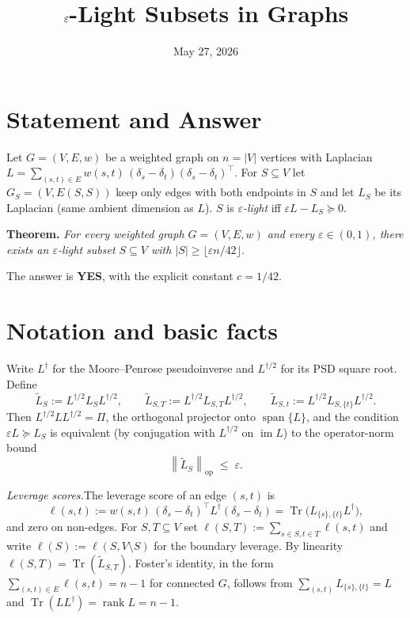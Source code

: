 \documentclass[11pt]{article}
\title{$\eps$-Light Subsets in Graphs}
\author{}
\date{May 27, 2026}
\newcommand{\eps}{\varepsilon}
\newcommand{\Tr}{\operatorname{Tr}}
\newcommand{\opnorm}[1]{\left\lVert #1 \right\rVert}
\DeclareMathOperator{\Span}{span}
\DeclareMathOperator{\im}{im}
\DeclareMathOperator{\rank}{rank}
\newcommand{\tL}{\widetilde{L}}
\newcommand{\Lt}{L^{\dagger}}
\newcommand{\Lth}{L^{\dagger/2}}
\begin{document}
\maketitle

\section*{Statement and Answer}

Let $G=(V,E,w)$ be a weighted graph on $n=|V|$ vertices with Laplacian
$L=\sum_{(s,t)\in E}w(s,t)\,(\delta_s-\delta_t)(\delta_s-\delta_t)^{\!\top}$.
For $S\subseteq V$ let $G_S=(V,E(S,S))$ keep only edges with both endpoints in
$S$ and let $L_S$ be its Laplacian (same ambient dimension as $L$). $S$ is
\emph{$\eps$-light} iff $\eps L - L_S\succeq 0$.

\medskip
\noindent\textbf{Theorem.} \emph{For every weighted graph $G=(V,E,w)$ and every
$\eps\in(0,1)$, there exists an $\eps$-light subset $S\subseteq V$ with
$|S|\ge \lfloor \eps n/42\rfloor$.}

\medskip
\noindent The answer is \textbf{YES}, with the explicit constant $c=1/42$.

\section*{Notation and basic facts}

Write $\Lt$ for the Moore--Penrose pseudoinverse and $\Lth$ for its PSD square
root. Define
\[
  \tL_S      := \Lth L_S \Lth, \qquad
  \tL_{S,T}  := \Lth L_{S,T}  \Lth, \qquad
  \tL_{S,t}  := \Lth L_{S,\{t\}}\Lth.
\]
Then $\Lth L \Lth = \Pi$, the orthogonal projector onto $\Span\{L\}$, and the
condition $\eps L\succeq L_S$ is equivalent (by conjugation with $\Lth$ on
$\im L$) to the operator-norm bound
\begin{equation}\label{eq:opnorm-form}
  \opnorm{\tL_S}_{\mathrm{op}} \;\le\; \eps.
\end{equation}

\medskip
\noindent\emph{Leverage scores.}\quad The leverage score of an edge $(s,t)$ is
\[
  \ell(s,t)
   := w(s,t)\,(\delta_s-\delta_t)^{\!\top}\Lt(\delta_s-\delta_t)
    = \Tr\!\bigl(L_{\{s\},\{t\}}\Lt\bigr),
\]
and zero on non-edges. For $S,T\subseteq V$ set
$\ell(S,T):=\sum_{s\in S,t\in T}\ell(s,t)$ and write
$\ell(S):=\ell(S,V\setminus S)$ for the boundary leverage. By linearity
$\ell(S,T)=\Tr(\tL_{S,T})$. Foster's identity, in the form
$\sum_{(s,t)\in E}\ell(s,t)=n-1$ for connected $G$, follows from
$\sum_{(s,t)}L_{\{s\},\{t\}}=L$ and $\Tr(L\Lt)=\rank L = n-1$.
\end{document}
